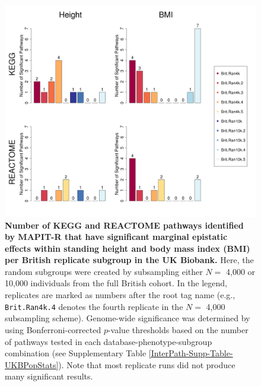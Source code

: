 \documentclass[10pt]{article}
\begin{document}
\begin{figure}[htbp]
\centering
\hspace*{-1.75cm}
\includegraphics[scale=.45]{Images/Supp/InterPath_Supp_Figure_BritReps_Barplot_vs4.png}
\caption{\textbf{Number of KEGG and REACTOME pathways identified by MAPIT-R that have significant marginal epistatic effects within standing height and body mass index (BMI) per British replicate subgroup in the UK Biobank.} Here, the random subgroups were created by subsampling either $N =$ 4,000 or 10,000 individuals from the full British cohort. In the legend, replicates are marked as numbers after the root tag name (e.g., \texttt{Brit.Ran4k.4} denotes the fourth replicate in the $N =$ 4,000 subsampling scheme). Genome-wide significance was determined by using Bonferroni-corrected $p$-value thresholds based on the number of pathways tested in each database-phenotype-subgroup combination (see Supplementary Table \ref{InterPath-Supp-Table-UKBPopStats}). Note that most replicate runs did not produce many significant results.}
\label{InterPath-Supp-Figure-BritReps-Barplots}
\end{figure}
\clearpage
\end{document}
